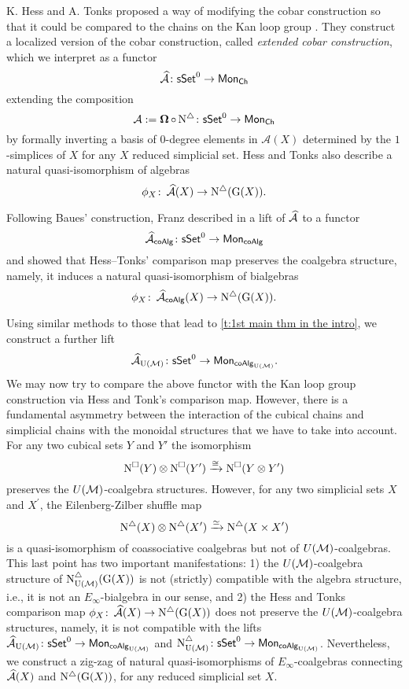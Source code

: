 K. Hess and A. Tonks proposed a way of modifying the cobar construction so that it could be compared to the chains on the Kan loop group \cite{hess2010cobar}.
They construct a localized version of the cobar construction, called \textit{extended cobar construction}, which we interpret as a functor
\[
\operatorname{\mathcal{\widehat{A}}} \colon \mathsf{sSet}^0 \to \mathsf{Mon}_{\mathsf{Ch}}
\]
extending the composition 
\[
\operatorname{\mathcal{A}}:= \operatorname{\mathbf{\Omega}} \circ \operatorname{N^{\triangle}} \colon \mathsf{sSet}^0 \to \mathsf{Mon}_{\mathsf{Ch}}
\]
by formally inverting a basis of $0$-degree elements in $\mathcal{A}(X)$ determined by the $1$-simplices of $X$ for any $X$ reduced simplicial set.
Hess and Tonks also describe a natural quasi-isomorphism of algebras
\[
\phi_X \colon \operatorname{\mathcal{\widehat{A}}}(X) \to \operatorname{N^{\triangle}}(\operatorname{G}(X)).
\]


Following Baues’ construction, Franz described in \cite{franz2020szczarba} a lift of $\operatorname{\mathcal{\widehat{A}}}$ to a functor
\[
\operatorname{\mathcal{\widehat{A}}}_{\mathsf{coAlg}} \colon \mathsf{sSet}^0 \to \mathsf{Mon}_{\mathsf{coAlg}}
\]
and showed that Hess--Tonks' comparison map preserves the coalgebra structure, namely, it induces a natural quasi-isomorphism of bialgebras
\[
\phi_X \colon \operatorname{\mathcal{\widehat{A}}}_{\mathsf{coAlg}}(X) \to \operatorname{N^{\triangle}} (\operatorname{G}(X)).
\]

Using similar methods to those that lead to \cref{t:1st main thm in the intro}, we construct a further lift
\[
\operatorname{\mathcal{\widehat{A}}}_{\operatorname{U}(\mathcal{M})} \colon \mathsf{sSet}^0 \to \mathsf{Mon}_{\mathsf{coAlg}_{\operatorname{U}(\mathcal{M})}}.
\]
We may now try to compare the above functor with the Kan loop group construction via Hess and Tonk's comparison map.
However, there is a fundamental asymmetry between the interaction of the cubical chains and simplicial chains with the monoidal structures that we have to take into account.
For any two cubical sets $Y$ and $Y'$ the isomorphism
\[
\operatorname{N^{\square}}(Y) \otimes \operatorname{N^{\square}}(Y') \xrightarrow{\cong} \operatorname{N^{\square}}(Y \otimes Y')
\]
preserves the $U(\mathcal{M})$-coalgebra structures.
However, for any two simplicial sets $X$ and $X^\prime$, the Eilenberg-Zilber shuffle map 
\[
\operatorname{N^{\triangle}}(X) \otimes \operatorname{N^{\triangle}}(X^\prime) \xrightarrow{\simeq} \operatorname{N^{\triangle}}(X \times X^\prime)
\]
is a quasi-isomorphism of coassociative coalgebras but not of $U(\mathcal{M})$-coalgebras.
This last point has two important manifestations: 1) the $U(\mathcal{M})$-coalgebra structure of $\operatorname{N^{\triangle}_{{\operatorname{U}(\mathcal{M})}}}(\operatorname{G}(X))$ is not (strictly) compatible with the algebra structure, i.e., it is not an $E_{\infty}$-bialgebra in our sense, and 2) the Hess and Tonks comparison map $\phi_X \colon \operatorname{\mathcal{\widehat{A}}}(X) \to \operatorname{N^{\triangle}}(\operatorname{G}(X))$ does not preserve the $U(\mathcal{M})$-coalgebra structures, namely, it is not compatible with the lifts $\operatorname{\mathcal{\widehat{A}}}_{\operatorname{U}(\mathcal{M})} \colon \mathsf{sSet}^0 \to \mathsf{Mon}_{\mathsf{coAlg}_{\operatorname{U}(\mathcal{M})}}$
and $\operatorname{N^{\triangle}_{{\operatorname{U}(\mathcal{M})}}} \colon \mathsf{sSet}^0 \to \mathsf{Mon}_{\mathsf{coAlg}_{\operatorname{U}(\mathcal{M})}}$.
Nevertheless, we construct a zig-zag of natural quasi-isomorphisms of $E_{\infty}$-coalgebras connecting $\operatorname{\mathcal{\widehat{A}}}(X)$ and $\operatorname{N^{\triangle}}(\operatorname{G}(X))$, for any reduced simplicial set $X$.

